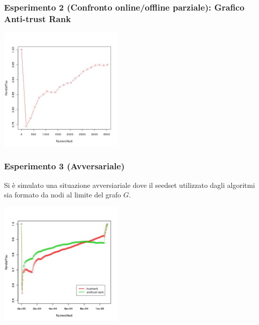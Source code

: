 \documentclass{beamer}
\begin{document}
  \begin{frame}
\frametitle{Esperimento 2 {\tiny(Confronto online/offline parziale)}: Grafico Anti-trust Rank}
\begin{center}
 \includegraphics[height=6cm]{immagini/test2/antiTrustraktGoodNodesTestMode1_62}
\end{center}
\end{frame}
\begin{frame}
 \frametitle{Esperimento 3 {\tiny(Avversariale)}}
 Si è  simulato una situazione avversiariale dove il seedset  utilizzato dagli algoritmi sia formato da nodi al limite del grafo \(G\).
\begin{center}
 \includegraphics[height=6cm]{immagini/test3/coplotTrustAnti_Mode1_set3776_62}
\end{center}
\end{frame}
\end{document}
